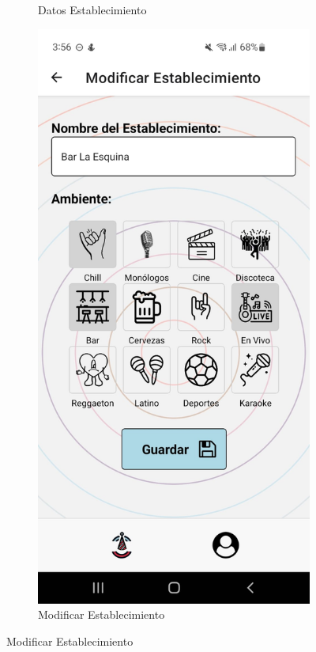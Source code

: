 \begin{figure}[H]
\begin{subfigure}{0.45\textwidth}
        \caption{Datos Establecimiento}
        \label{fig:img5}
    \end{subfigure}%
    \hfill
    \begin{subfigure}{0.45\textwidth}
        \centering
        \includegraphics[width=\linewidth]{imagenes/Capturas/ModificarEstablecimiento.jpeg}
        \caption{Modificar Establecimiento}
        \label{fig:img6}
    \end{subfigure}
\end{figure}
\vspace*{\fill}


